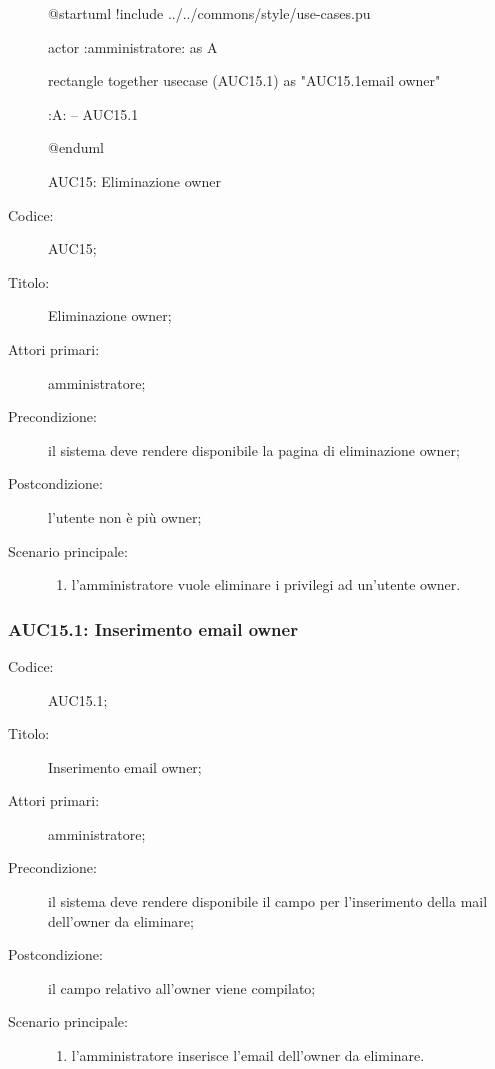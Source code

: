\documentclass[../../../analisi-dei-requisiti.tex]{subfiles}
\begin{document}
\begin{figure}[H]
  \centering
  \begin{plantuml}
  @startuml
  !include ../../commons/style/use-cases.pu

  actor :amministratore: as A

  rectangle {
    together {
      usecase (AUC15.1) as "AUC15.1\nInserimento email owner"
    }
  }

  :A: -- AUC15.1

  @enduml
  \end{plantuml}
  \caption{AUC15: Eliminazione owner}%
  \label{fig:auc15}
\end{figure}

\begin{description}
  \item[Codice:] AUC15;
  \item[Titolo:] Eliminazione owner;
  \item[Attori primari:] amministratore;
  \item[Precondizione:] il sistema deve rendere disponibile la pagina di eliminazione owner;
  \item[Postcondizione:] l'utente non è più owner;
  \item[Scenario principale:]
  \begin{enumerate}
    \item l'amministratore vuole eliminare i privilegi ad un'utente owner.
  \end{enumerate}
\end{description}

\subsubsection{AUC15.1: Inserimento email owner}%
\label{subs:AUC15.1}
\begin{description}
  \item[Codice:] AUC15.1;
  \item[Titolo:] Inserimento email owner;
  \item[Attori primari:] amministratore;
  \item[Precondizione:] il sistema deve rendere disponibile il campo per l'inserimento della mail dell'owner da eliminare;
  \item[Postcondizione:] il campo relativo all'owner viene compilato;
  \item[Scenario principale:]
  \begin{enumerate}
    \item l'amministratore inserisce l'email dell'owner da eliminare.
  \end{enumerate}
\end{description}
\end{document}

